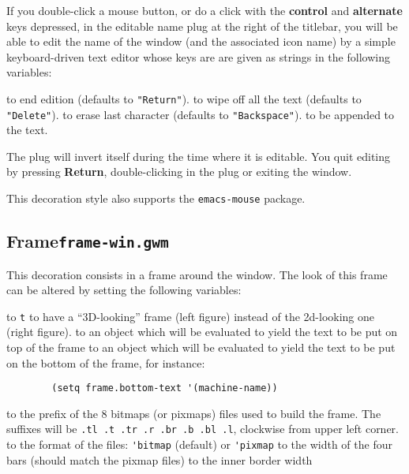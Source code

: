 If you double-click a mouse button, or do a click with the {\bf control} and
{\bf alternate} keys depressed, in the editable name plug at the right of
the titlebar, you will be able to edit the name of the window (and the
associated icon name) by a simple keyboard-driven text editor whose keys
are are given as strings in the following variables:

\begin{description}
 to end edition (defaults to \verb|"Return"|).
 to wipe off all the text (defaults to 
\verb|"Delete"|).
 to erase last character (defaults to 
\verb|"Backspace"|).
 to be appended to the text.
\end{description}

The plug will invert itself during the time where it is editable. You quit
editing by pressing {\bf Return}, double-clicking in the plug or exiting the
window.

This decoration style also supports the \verb"emacs-mouse" package.

\subsection{Frame\hfill{\tt frame-win.gwm}}
\label{frame-win}

\centerline{}

This decoration consists in a frame around the window. The look of this
frame can be altered by setting the following variables:

\begin{description}
 to {\tt t} to have a ``3D-looking'' frame (left figure) 
instead of the 2d-looking one (right figure).
 to an object which will be evaluated to yield the
text to be put on top of the frame
 to an object which will be evaluated to yield the
text to be put on the bottom of the frame, for instance:
{\exemplefont\begin{verbatim}
        (setq frame.bottom-text '(machine-name))
\end{verbatim}}
 to the prefix of the 8 bitmaps (or pixmaps) files
used to build the frame. The suffixes will be {\tt .tl .t .tr .r .br .b .bl
.l}, clockwise from upper left corner.
 to the format of the files: \verb"'bitmap"
(default) or \verb"'pixmap"
 to the width of the four bars (should match the
pixmap files)
 to the inner border width
\end{description}

